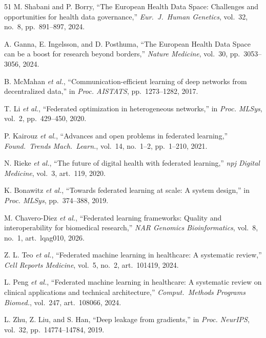 \documentclass[conference,a4paper]{IEEEtran}
\begin{document}
\begin{thebibliography}{51}
M. Shabani and P. Borry, ``The European Health Data Space: Challenges and opportunities for health data governance,'' \textit{Eur.~J.~Human Genetics}, vol.~32, no.~8, pp.~891--897, 2024.

A. Ganna, E. Ingelsson, and D. Posthuma, ``The European Health Data Space can be a boost for research beyond borders,'' \textit{Nature Medicine}, vol.~30, pp.~3053--3056, 2024.

B. McMahan \textit{et al.}, ``Communication-efficient learning of deep networks from decentralized data,'' in \textit{Proc. AISTATS}, pp.~1273--1282, 2017.

T. Li \textit{et al.}, ``Federated optimization in heterogeneous networks,'' in \textit{Proc. MLSys}, vol.~2, pp.~429--450, 2020.

P. Kairouz \textit{et al.}, ``Advances and open problems in federated learning,'' \textit{Found.~Trends Mach.~Learn.}, vol.~14, no.~1--2, pp.~1--210, 2021.

N. Rieke \textit{et al.}, ``The future of digital health with federated learning,'' \textit{npj Digital Medicine}, vol.~3, art.~119, 2020.

K. Bonawitz \textit{et al.}, ``Towards federated learning at scale: A system design,'' in \textit{Proc. MLSys}, pp.~374--388, 2019.

M. Chavero-Diez \textit{et al.}, ``Federated learning frameworks: Quality and interoperability for biomedical research,'' \textit{NAR Genomics Bioinformatics}, vol.~8, no.~1, art.~lqag010, 2026.

Z. L. Teo \textit{et al.}, ``Federated machine learning in healthcare: A systematic review,'' \textit{Cell Reports Medicine}, vol.~5, no.~2, art.~101419, 2024.

L. Peng \textit{et al.}, ``Federated machine learning in healthcare: A systematic review on clinical applications and technical architecture,'' \textit{Comput.~Methods Programs Biomed.}, vol.~247, art.~108066, 2024.

L. Zhu, Z. Liu, and S. Han, ``Deep leakage from gradients,'' in \textit{Proc. NeurIPS}, vol.~32, pp.~14774--14784, 2019.


\end{thebibliography}
\end{document}
